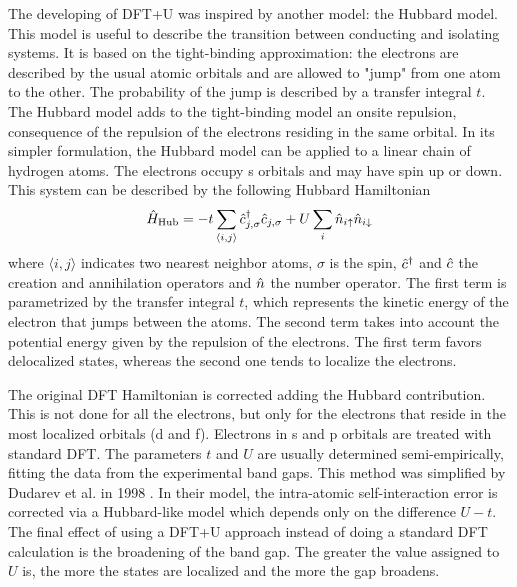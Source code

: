 The developing of DFT+U was inspired by another model: the Hubbard model. This model is useful to describe the transition between conducting and isolating systems. It is based on the tight-binding approximation: the electrons are described by the usual atomic orbitals and are allowed to "jump" from one atom to the other. The probability of the jump is described by a transfer integral $t$. The Hubbard model adds to the tight-binding model an onsite repulsion, consequence of the repulsion of the electrons residing in the same orbital. In its simpler formulation, the Hubbard model can be applied to a linear chain of hydrogen atoms. The electrons occupy s orbitals and may have spin up or down. This system can be described by the following Hubbard Hamiltonian
\begin{equation}
    \hat{H}_\text{Hub} = -t \sum_{\langle i,j \rangle} \hat{c}^\dagger_{j,\sigma}\hat{c}_{j,\sigma} + U \sum_i \hat{n}_{i\uparrow} \hat{n}_{i\downarrow}
\end{equation}
where $\langle i,j \rangle$ indicates two nearest neighbor atoms, $\sigma$ is the spin, $\hat{c}^\dagger$ and $\hat{c}$ the creation and annihilation operators and $\hat{n}$ the number operator. The first term is parametrized by the transfer integral $t$, which represents the kinetic energy of the electron that jumps between the atoms. The second term takes into account the potential energy given by the repulsion of the electrons. The first term favors delocalized states, whereas the second one tends to localize the electrons.

The original DFT Hamiltonian is corrected adding the Hubbard contribution. This is not done for all the electrons, but only for the electrons that reside in the most localized orbitals (d and f). Electrons in s and p orbitals are treated with standard DFT. The parameters $t$ and $U$ are usually determined semi-empirically, fitting the data from the experimental band gaps. This method was simplified by Dudarev et al. in 1998 \cite{dudarev1998}. In their model, the intra-atomic self-interaction error is corrected via a Hubbard-like model which depends only on the difference $U-t$. The final effect of using a DFT+U approach instead of doing a standard DFT calculation is the broadening of the band gap. The greater the value assigned to $U$ is, the more the states are localized and the more the gap broadens.


